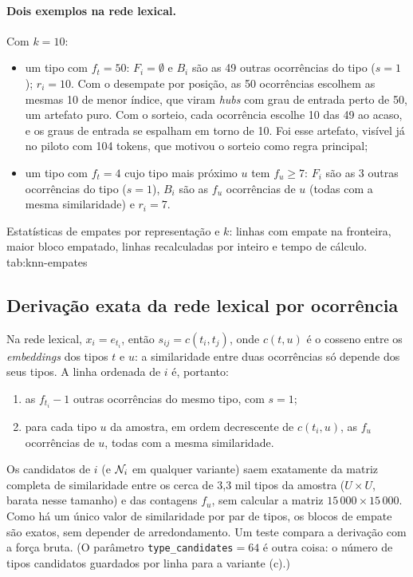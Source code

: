 \paragraph{Dois exemplos na rede lexical.} Com $k=10$:
\begin{itemize}
    \item um tipo com $f_t=50$: $F_i=\emptyset$ e $B_i$ são as 49 outras ocorrências do tipo
    ($s=1$); $r_i=10$. Com o desempate por posição, as 50 ocorrências escolhem as mesmas 10 de
    menor índice, que viram \emph{hubs} com grau de entrada perto de 50, um artefato puro. Com
    o sorteio, cada ocorrência escolhe 10 das 49 ao acaso, e os graus de entrada se espalham em
    torno de 10. Foi esse artefato, visível já no piloto com 104 tokens, que motivou o sorteio
    como regra principal;
    \item um tipo com $f_t=4$ cujo tipo mais próximo $u$ tem $f_u\ge7$: $F_i$ são as 3 outras
    ocorrências do tipo ($s=1$), $B_i$ são as $f_u$ ocorrências de $u$ (todas com a mesma
    similaridade) e $r_i=7$.
\end{itemize}

    {Estatísticas de empates por representação e $k$: linhas com empate na fronteira, maior
    bloco empatado, linhas recalculadas por inteiro e tempo de cálculo.}
    {tab:knn-empates}

\subsection{Derivação exata da rede lexical por ocorrência}\label{sec:red-derivacao}

Na rede lexical, $x_i=e_{t_i}$, então $s_{ij}=c(t_i,t_j)$, onde $c(t,u)$ é o cosseno entre os
\emph{embeddings} dos tipos $t$ e $u$: a similaridade entre duas ocorrências só depende dos
seus tipos. A linha ordenada de $i$ é, portanto:
\begin{enumerate}
    \item as $f_{t_i}-1$ outras ocorrências do mesmo tipo, com $s=1$;
    \item para cada tipo $u$ da amostra, em ordem decrescente de $c(t_i,u)$, as $f_u$
    ocorrências de $u$, todas com a mesma similaridade.
\end{enumerate}
Os candidatos de $i$ (e $\mathcal{N}_i$ em qualquer variante) saem exatamente da matriz completa de
similaridade entre os cerca de 3,3 mil tipos da amostra ($U\times U$, barata nesse tamanho) e
das contagens $f_u$, sem calcular a matriz $15\,000\times15\,000$. Como há um único valor de
similaridade por par de tipos, os blocos de empate são exatos, sem depender de arredondamento.
Um teste compara a derivação com a força bruta. (O parâmetro \texttt{type\_candidates}${}=64$
é outra coisa: o número de tipos candidatos guardados por linha para a variante (c).)

